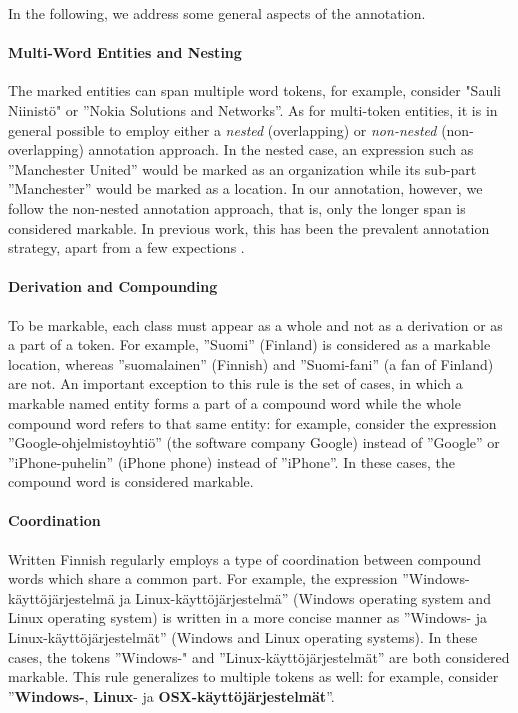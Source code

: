 \documentclass[11pt]{article}
\begin{document}
In the following, we address some general aspects of the annotation.

\paragraph{Multi-Word Entities and Nesting}

The marked entities can span multiple word tokens, for example, consider "Sauli Niinist\"o" or ''Nokia Solutions and Networks''. As for multi-token entities, it is in general possible to employ either a \textit{nested} (overlapping) or \textit{non-nested} (non-overlapping) annotation approach. In the nested case, an expression such as ''Manchester United'' would be marked as an organization while its sub-part ''Manchester'' would be marked as a location.  In our annotation, however, we follow the non-nested annotation approach, that is, only the longer span is considered markable. In previous work, this has been the prevalent annotation strategy, apart from a few expections \citep{byrne2007,benikova2014}.

\paragraph{Derivation and Compounding}

To be markable, each class must appear as a whole and not as a derivation or as a part of a token. For example, ''Suomi'' (Finland) is considered as a markable location, whereas ''suomalainen'' (Finnish) and ''Suomi-fani'' (a fan of Finland) are not.  An important exception to this rule is the set of cases, in which a markable named entity forms a part of a compound word while the whole compound word refers to that same entity: for example, consider the expression ''Google-ohjelmistoyhti\"o'' (the software company Google) instead of  ''Google'' or ''iPhone-puhelin'' (iPhone phone) instead of ''iPhone''. In these cases, the compound word is considered markable.

\paragraph{Coordination}

Written Finnish regularly employs a type of coordination between compound words which share a common part. For example, the expression ''Windows-k\"aytt\"oj\"arjestelm\"a ja Linux-k\"aytt\"oj\"arjestelm\"a'' (Windows operating system and Linux operating system) is written in a more concise manner as ''Windows- ja Linux-k\"aytt\"oj\"arjestelm\"at'' (Windows and Linux operating systems). In these cases, the tokens ''Windows-" and ''Linux-k\"aytt\"oj\"arjestelm\"at'' are both considered markable. This rule generalizes to multiple tokens as well: for example, consider ''\textbf{Windows-}, \textbf{Linux}- ja \textbf{OSX-k\"aytt\"oj\"arjestelm\"at}''.
\end{document}
